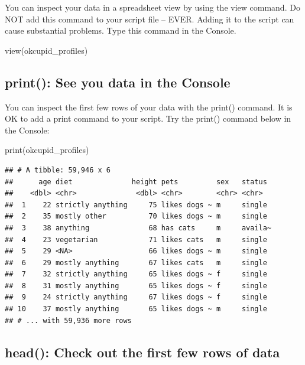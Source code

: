 \documentclass[
]{krantz}
\makeatletter
\newenvironment{Shaded}{\begin{snugshade}}{\end{snugshade}}
\newcommand{\FunctionTok}[1]{\textcolor[rgb]{0,0,0}{#1}}
\newcommand{\NormalTok}[1]{#1}
\newenvironment{kframe}{%
\medskip{}
\setlength{\fboxsep}{.8em}
 \def\at@end@of@kframe{}%
 \ifinner\ifhmode%
  \def\at@end@of@kframe{\end{minipage}}%
  \begin{minipage}{\columnwidth}%
 \fi\fi%
 \def\FrameCommand##1{\hskip\@totalleftmargin \hskip-\fboxsep
 \colorbox{shadecolor}{##1}\hskip-\fboxsep
     \hskip-\linewidth \hskip-\@totalleftmargin \hskip\columnwidth}%
 \MakeFramed {\advance\hsize-\width
   \@totalleftmargin\z@ \linewidth\hsize
   \@setminipage}}%
 {\par\unskip\endMakeFramed%
 \at@end@of@kframe}
\renewenvironment{Shaded}{\begin{kframe}}{\end{kframe}}
\makeatother
\begin{document}
You can inspect your data in a spreadsheet view by using the view command. Do NOT add this command to your script file -- EVER. Adding it to the script can cause substantial problems. Type this command in the Console.

\begin{Shaded}
\begin{Highlighting}[]
\FunctionTok{view}\NormalTok{(okcupid\_profiles)}
\end{Highlighting}
\end{Shaded}

\hypertarget{print-see-you-data-in-the-console}{%
\subsection{print(): See you data in the Console}\label{print-see-you-data-in-the-console}}

You can inspect the first few rows of your data with the print() command. It is OK to add a print command to your script. Try the print() command below in the Console:

\begin{Shaded}
\begin{Highlighting}[]
\FunctionTok{print}\NormalTok{(okcupid\_profiles)}
\end{Highlighting}
\end{Shaded}

\begin{verbatim}
## # A tibble: 59,946 x 6
##      age diet              height pets         sex   status 
##    <dbl> <chr>              <dbl> <chr>        <chr> <chr>  
##  1    22 strictly anything     75 likes dogs ~ m     single 
##  2    35 mostly other          70 likes dogs ~ m     single 
##  3    38 anything              68 has cats     m     availa~
##  4    23 vegetarian            71 likes cats   m     single 
##  5    29 <NA>                  66 likes dogs ~ m     single 
##  6    29 mostly anything       67 likes cats   m     single 
##  7    32 strictly anything     65 likes dogs ~ f     single 
##  8    31 mostly anything       65 likes dogs ~ f     single 
##  9    24 strictly anything     67 likes dogs ~ f     single 
## 10    37 mostly anything       65 likes dogs ~ m     single 
## # ... with 59,936 more rows
\end{verbatim}

\hypertarget{head-check-out-the-first-few-rows-of-data}{%
\subsection{head(): Check out the first few rows of data}\label{head-check-out-the-first-few-rows-of-data}}
\end{document}
